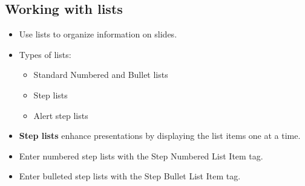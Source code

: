 \documentclass[notes=show,beamer]{beamer}
\newenvironment{stepitemize}{\begin{itemize}[<+->]}{\end{itemize} }
\begin{document}
\subsection{Working with lists}

\begin{frame}%


\begin{itemize}
\item Use lists to organize information on slides.

\item Types of lists:

\begin{itemize}
\item Standard Numbered and Bullet lists

\item Step lists

\item Alert step lists
\end{itemize}
\end{itemize}

\transboxout%
\end{frame}%

\begin{frame}%



\begin{stepitemize}
\item \textbf{Step lists} enhance presentations by displaying the list items
one at a time.

\item Enter numbered step lists with the Step Numbered List Item tag.

\item Enter bulleted step lists with the Step Bullet List Item tag.
\end{stepitemize}

\transboxout%
\end{frame}%
\end{document}
